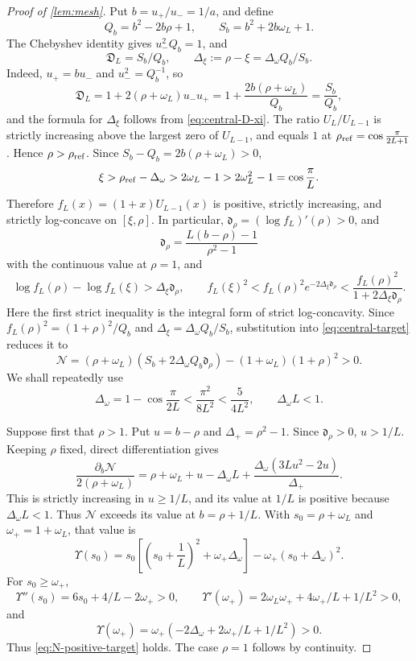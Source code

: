 \documentclass[review,hidelinks,onefignum,onetabnum]{siamart251216}
\begin{document}
\begin{proof}[Proof of \cref{lem:mesh}]
Put \(b=u_+/u_-=1/a\), and define
\[
 Q_b=b^2-2b\rho+1,\qquad S_b=b^2+2b\omega_L+1.
\]
The Chebyshev identity gives \(u_-^2Q_b=1\), and
\begin{equation}\label{eq:central-D-QS}
 \mathfrak D_L=S_b/Q_b,\qquad
 \Delta_\xi:=\rho-\xi=\Delta_\omega Q_b/S_b.
\end{equation}
Indeed, \(u_+=bu_-\) and \(u_-^2=Q_b^{-1}\), so
\[
 \mathfrak D_L=1+2(\rho+\omega_L)u_-u_+
  =1+\frac{2b(\rho+\omega_L)}{Q_b}=\frac{S_b}{Q_b},
\]
and the formula for \(\Delta_\xi\) follows from
\eqref{eq:central-D-xi}.
The ratio \(U_L/U_{L-1}\) is strictly increasing above the largest zero
of \(U_{L-1}\), and equals \(1\) at
\(\rho_{\rm ref}=\cos\frac{\pi}{2L+1}\).  Hence
\(\rho>\rho_{\rm ref}\).  Since
\(S_b-Q_b=2b(\rho+\omega_L)>0\),
\[
 \xi>\rho_{\rm ref}-\Delta_\omega>2\omega_L-1
 >2\omega_L^2-1=\cos\frac{\pi}{L}.
\]
Therefore \(f_L(x)=(1+x)U_{L-1}(x)\) is positive, strictly increasing,
and strictly log-concave on \([\xi,\rho]\).  In particular,
\(\mathfrak d_\rho=(\log f_L)'(\rho)>0\), and
\[
 \mathfrak d_\rho=\frac{L(b-\rho)-1}{\rho^2-1}
\]
with the continuous value at \(\rho=1\), and
\[
 \log f_L(\rho)-\log f_L(\xi)>\Delta_\xi\mathfrak d_\rho,
 \qquad
 f_L(\xi)^2<f_L(\rho)^2e^{-2\Delta_\xi\mathfrak d_\rho}
 <\frac{f_L(\rho)^2}{1+2\Delta_\xi\mathfrak d_\rho}.
\]
Here the first strict inequality is the integral form of strict
log-concavity.  Since
\(f_L(\rho)^2=(1+\rho)^2/Q_b\) and
\(\Delta_\xi=\Delta_\omega Q_b/S_b\), substitution into
\eqref{eq:central-target} reduces it to
\begin{equation}\label{eq:N-positive-target}
 \mathcal N=(\rho+\omega_L)
 (S_b+2\Delta_\omega Q_b\mathfrak d_\rho)
 -(1+\omega_L)(1+\rho)^2>0.
\end{equation}
We shall repeatedly use
\begin{equation}\label{eq:Delta-omega-basic-bound}
 \Delta_\omega=1-\cos\frac{\pi}{2L}
 <\frac{\pi^2}{8L^2}<\frac5{4L^2},
 \qquad \Delta_\omega L<1.
\end{equation}

Suppose first that \(\rho>1\).  Put \(u=b-\rho\) and
\(\Delta_+=\rho^2-1\).  Since \(\mathfrak d_\rho>0\), \(u>1/L\).
Keeping \(\rho\) fixed,
direct differentiation gives
\[
 \frac{\partial_b\mathcal N}{2(\rho+\omega_L)}
 =\rho+\omega_L+u-\Delta_\omega L
 +\frac{\Delta_\omega(3Lu^2-2u)}{\Delta_+}.
\]
This is strictly increasing in \(u\geq1/L\), and its value at \(1/L\)
is positive because \(\Delta_\omega L<1\).  Thus \(\mathcal N\)
exceeds its value at
\(b=\rho+1/L\).  With
\(s_0=\rho+\omega_L\) and \(\omega_+=1+\omega_L\), that value is
\[
 \Upsilon(s_0)
 =s_0\left[\left(s_0+\frac1L\right)^2+\omega_+\Delta_\omega\right]
 -\omega_+(s_0+\Delta_\omega)^2.
\]
For \(s_0\geq\omega_+\),
\[
 \Upsilon''(s_0)=6s_0+4/L-2\omega_+>0,\qquad
 \Upsilon'(\omega_+)=2\omega_L\omega_++4\omega_+/L+1/L^2>0,
\]
and
\[
 \Upsilon(\omega_+)
 =\omega_+(-2\Delta_\omega+2\omega_+/L+1/L^2)>0.
\]
Thus \eqref{eq:N-positive-target} holds.  The case \(\rho=1\) follows
by continuity.


\end{proof}
\end{document}
